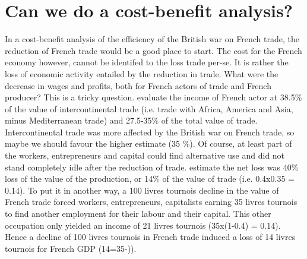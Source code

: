 \documentclass[12pt,a4paper,notitlepage,english]{article}
\begin{document}

\section{Can we do a cost-benefit analysis?}
\label{sec:cost_benefit}
In a cost-benefit analysis of the efficiency of the British war on French trade, the reduction of French trade would be a good place to start. 
The cost for the French economy however, cannot be identifed to the loss trade per-se.
It is rather the loss of economic activity entailed by the reduction in trade.
What were the decrease in wages and profits, both for French actors of trade and French producer?
This is a tricky question.
\cite[p. 408]{Daudin2005} evaluate the income of French actor at 38.5\% of the value of intercontinental trade (i.e. trade with Africa, America and Asia, minus Mediterranean trade) and 27.5-35\% of the total value of trade.
Intercontinental trade was more affected by the British war on French trade, so maybe we should favour the higher estimate (35 \%).
Of course, at least part of the workers, entrepreneurs and capital could find alternative use and did not stand completely idle after the reduction of trade. 
\cite[p. 421]{Daudin2005} estimate the net loss was 40\% loss of the value of the production, or 14\% of the value of trade (i.e. 0.4x0.35 = 0.14). 
To put it in another way, a 100 livres tournois decline in the value of French trade forced workers, entrepreneurs, capitalists earning 35 livres tournois to find another employment for their labour and their capital. This other occupation only yielded an income of 21 livres tournois (35x(1-0.4) = 0.14).
Hence a decline of 100 livres tournois in French trade induced a loss of 14 livres tournois for French GDP (14=35-)). 
\end{document}
